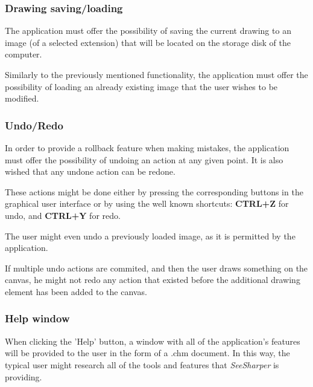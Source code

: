 \documentclass[12pt]{article}
\begin{document}
\subsubsection{Drawing saving/loading}

The application must offer the possibility of saving the current drawing to an image (of a selected extension) that will be located on the storage disk of the computer.

Similarly to the previously mentioned functionality, the application must offer the possibility of loading an already existing image that the user wishes to be modified.

\subsubsection{Undo/Redo}

In order to provide a rollback feature when making mistakes, the application must offer the possibility of undoing an action at any given point. It is also wished that any undone action can be redone.

These actions might be done either by pressing the corresponding buttons in the graphical user interface or by using the well known shortcuts: \textbf{CTRL+Z} for undo, and \textbf{CTRL+Y} for redo.

The user might even undo a previously loaded image, as it is permitted by the application.

If multiple undo actions are commited, and then the user draws something on the canvas, he might not redo any action that existed before the additional drawing element has been added to the canvas.

\subsubsection{Help window}

When clicking the 'Help' button, a window with all of the application's features will be provided to the user in the form of a .chm document. In this way, the typical user might research all of the tools and features that \textit{SeeSharper} is providing.
\end{document}
